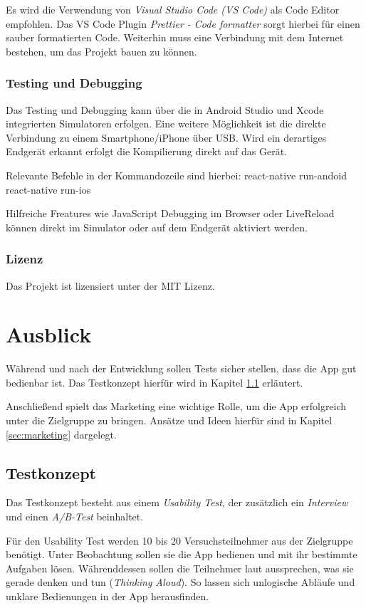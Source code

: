 Es wird die Verwendung von \emph{Visual Studio Code (VS Code)} als Code Editor empfohlen.
Das VS Code Plugin \emph{Prettier - Code formatter} sorgt hierbei für einen sauber formatierten Code. Weiterhin muss eine Verbindung mit dem Internet bestehen, um das Projekt bauen zu können.

\subsection{Testing und Debugging}
Das Testing und Debugging kann über die in Android Studio und Xcode integrierten Simulatoren erfolgen.
Eine weitere Möglichkeit ist die direkte Verbindung zu einem Smartphone/iPhone über USB.
Wird ein derartiges Endgerät erkannt erfolgt die Kompilierung direkt auf das Gerät.

Relevante Befehle in der Kommandozeile sind hierbei:
react-native run-andoid
react-native run-ios

Hilfreiche Freatures wie JavaScript Debugging im Browser oder LiveReload können direkt im Simulator oder auf dem Endgerät aktiviert werden.


\subsection{Lizenz}
Das Projekt ist lizensiert unter der MIT Lizenz.

\chapter{Ausblick}
\label{ausblick}
Während und nach der Entwicklung sollen Tests sicher stellen, dass die App gut bedienbar ist. Das Testkonzept hierfür wird in Kapitel \ref{sec:testkonzept} erläutert.

Anschließend spielt das Marketing eine wichtige Rolle, um die App erfolgreich unter die Zielgruppe zu bringen. Ansätze und Ideen hierfür sind in Kapitel \ref{sec:marketing} dargelegt.

\section{Testkonzept}
\label{sec:testkonzept}
Das Testkonzept besteht aus einem \emph{Usability Test}, der zusätzlich ein \emph{Interview} und einen \emph{A/B-Test} beinhaltet.

Für den Usability Test werden 10 bis 20  Versuchsteilnehmer aus der Zielgruppe benötigt. Unter Beobachtung sollen sie die App bedienen und mit ihr bestimmte Aufgaben lösen. Währenddessen sollen die Teilnehmer laut aussprechen, was sie gerade denken und tun (\emph{Thinking Aloud}). So lassen sich unlogische Abläufe und unklare Bedienungen in der App herausfinden.

